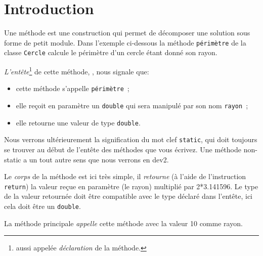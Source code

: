 \documentclass[a4paper,11pt]{style-esi/td}
\begin{document}
	 
\section{Introduction}

	Une méthode est une construction qui permet de décomposer une solution sous forme de petit module.
	Dans l'exemple ci-dessous la méthode \texttt{périmètre} de la classe \texttt{Cercle} calcule le périmètre d'un cercle 
	étant donné son rayon.
	
	

	\emph{L'entête}\footnote{aussi appelée \emph{déclaration} de la méthode. } de cette méthode, ,  nous signale que:
	\begin{itemize}
		\item cette méthode s'appelle \texttt{périmètre}~;
		\item elle reçoit en paramètre un \texttt{double} qui sera manipulé par son nom \texttt{rayon}~;
		\item elle retourne une valeur de type \texttt{double}.
	\end{itemize}
	Nous verrons ultérieurement la signification du mot clef \texttt{static}, qui doit toujours se trouver au début de l'entête des méthodes
	que vous écrivez. Une méthode non-static a un tout autre sens que nous verrons en dev2.

	Le \emph{corps} de la méthode est ici très simple, il \emph{retourne} (à l'aide de l'instruction  \texttt{return})
	 la valeur reçue en paramètre (le rayon) multiplié par 2*3.141596.
	Le type de la valeur retournée doit être compatible avec le type déclaré dans l'entête, 
	ici cela doit être un \texttt{double}.	
	
	La méthode principale \emph{appelle}  cette méthode avec la valeur 10 comme rayon. 
\end{document}
